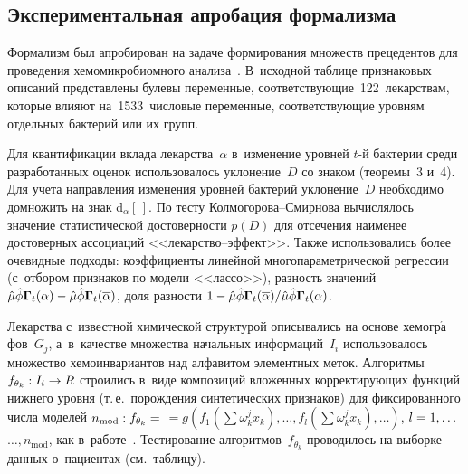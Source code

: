 \begin{multicols}{2}
\section{Экспериментальная апробация формализма}

     Формализм был апробирован на задаче формирования множеств 
прецедентов для проведения хе\-мо\-мик\-ро\-биом\-но\-го анализа~\cite{3-tor, 8-tor}. 
В~исходной таб\-ли\-це признаковых описаний пред\-став\-ле\-ны булевы 
переменные, со\-от\-вет\-ст\-ву\-ющие~122~лекарствам, которые влияют 
на~1533~чис\-ло\-вые переменные, со\-от\-вет\-ст\-ву\-ющие уров\-ням отдельных 
бактерий или их групп. 
     
     Для квантификации вклада лекарства~$\alpha$ в~изменение уров\-ней $t$-й 
бактерии среди разработанных оценок использовалось уклонение~$D$ со 
знаком (тео\-ре\-мы~3 и~4). Для учета на\-прав\-ле\-ния изменения уров\-ней 
бактерий уклонение~$D$ необходимо до\-мно\-жить на знак d$_\alpha [\,]$. По 
тес\-ту Кол\-мо\-го\-ро\-ва--Смир\-но\-ва вы\-чис\-ля\-лось значение 
ста\-ти\-сти\-че\-ской до\-сто\-вер\-ности $p(D)$ для отсечения наименее до\-сто\-вер\-ных 
ассоциаций <<ле\-карст\-во--эф\-фект>>. Так\-же использовались более 
очевидные подходы: коэффициенты линейной мно\-го\-па\-ра\-мет\-ри\-че\-ской 
регрессии (с~отбором признаков по модели <<лассо>>), раз\-ность значений 
     $\hat{\mu}\hat{\phi}\bm{\Gamma}_t(\alpha) \hm- \hat{\mu} \hat{\phi} 
\bm{\Gamma}_t(\overline{\alpha})$, доля раз\-ности $1\hm- \hat{\mu} \hat{\phi} 
\bm{\Gamma}_t(\overline{\alpha})/ \hat{\mu} \hat{\phi} 
\bm{\Gamma}_t(\alpha)$. 
     
     Лекарства с~известной химической структурой описывались на осно\-ве 
хемогр$\acute{\mbox{а}}$фов~$G_j$, а~в~качестве множества начальных 
информаций~$I_i$ использовалось множество хемоинвариантов над 
алфавитом элементных меток. \mbox{Алгоритмы}\linebreak $f_{\theta_k}: I_i\hm\to R$ 
строились в~виде композиций вло\-жен\-ных кор\-рек\-ти\-ру\-ющих функций 
ниж\-не\-го уров\-ня (т.\,е.\ по\-рож\-де\-ния синтетических при\-зна\-ков) для 
фиксированного чис\-ла моделей  $n_{\mathrm{mod}}: f_{\theta_k} \hm=$
$= g 
(f_1(\sum \omega_k^j x_k), \ldots , f_l(\sum \omega_k^j x_k),\ldots)$, $l\hm=1, 
\ldots$\linebreak $\ldots , n_{\mathrm{mod}}$, как в~работе~\cite{5-tor}. Тес\-ти\-ро\-ва\-ние 
ал\-го\-рит\-мов~$f_{\theta_k}$ проводилось на выборке данных о~пациентах 
(см.\ таб\-лицу).
     


\end{multicols}

